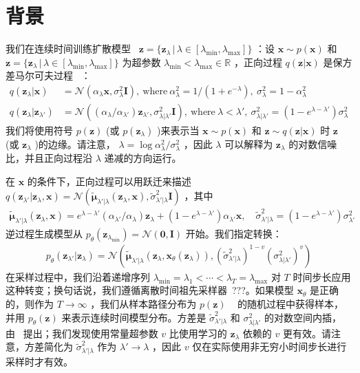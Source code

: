 \documentclass{article}
\newcommand{\bI}{\mathbf{I}}
\newcommand{\bzero}{\mathbf{0}}
\newcommand{\bx}{\mathbf{x}}
\newcommand{\bz}{\mathbf{z}}
\newcommand{\bmu}{{\boldsymbol{\mu}}}
\begin{document}
 \section{
背景} 
 \label{sec:background} 我们在连续时间训练扩散模型~ $\bz =  \{ \bz_\lambda \,|\, \lambda \in [\lambda_{\mathrm{min}}, \lambda_{\mathrm{max}}] \} $ ：设 $\bx \sim p(\bx)$ 和 $\bz =  \{ \bz_\lambda \,|\, \lambda \in [\lambda_{\mathrm{min}}, \lambda_{\mathrm{max}}] \} $ 为超参数 $\lambda_{\mathrm{min}} < \lambda_{\mathrm{max}} \in \mathbb{R}$ ，正向过程 $q(\bz|\bx)$ 是保方差马尔可夫过程~ \citep{sohl2015deep} ：
 \begin{align}
q(\bz_\lambda|\bx) &= \mathcal{N}(\alpha_\lambda \bx, \sigma_\lambda^2 \bI),  \  \text{where} \  \alpha_\lambda^2 = 1/(1+e^{-\lambda}), \  \sigma_\lambda^2 = 1-\alpha_\lambda^2  \\ 
q(\bz_{\lambda} | \bz_{\lambda'}) &= \mathcal{N}((\alpha_{\lambda}/\alpha_{\lambda'})\bz_{\lambda'}, \sigma_{\lambda|\lambda'}^2\bI),  \  \text{where} \  \lambda < \lambda', \  
\sigma^2_{\lambda|\lambda'} = (1-e^{\lambda-\lambda'})\sigma_\lambda^2 
\end{align} 我们将使用符号 $p(\bz)$ (或 $p(\bz_\lambda)$ )来表示当 $\bx \sim p(\bx)$ 和 $\bz \sim q(\bz|\bx)$ 时 $\bz$ (或 $\bz_\lambda$ )的边缘。请注意， $\lambda = \log \alpha_\lambda^2/\sigma_\lambda^2$ ，因此 $\lambda$ 可以解释为 $\bz_\lambda$ 的对数信噪比，并且正向过程沿 $\lambda$ 递减的方向运行。


在 $\bx$ 的条件下，正向过程可以用跃迁来描述
 $q(\bz_{\lambda'}|\bz_\lambda,\bx) = \mathcal{N}(\tilde\bmu_{\lambda'|\lambda}(\bz_\lambda,\bx), \tilde\sigma^2_{\lambda'|\lambda}\bI)$ ，其中
 \begin{align}
\tilde\bmu_{\lambda'|\lambda}(\bz_\lambda,\bx) = e^{\lambda-\lambda'}(\alpha_{\lambda'}/\alpha_{\lambda})\bz_\lambda + (1-e^{\lambda - \lambda'})\alpha_{\lambda'}\bx,
\quad \tilde\sigma^2_{\lambda'|\lambda} = (1-e^{\lambda-\lambda'})\sigma_{\lambda'}^2
\end{align} 逆过程生成模型从 $p_\theta(\bz_{\lambda_{\mathrm{min}}}) = \mathcal{N}(\bzero, \bI)$ 开始。我们指定转换：
 \begin{align}p_\theta(\bz_{\lambda'}|\bz_{\lambda}) = \mathcal{N}(\tilde\bmu_{\lambda'|\lambda}(\bz_\lambda,\bx_\theta(\bz_\lambda)),  (\tilde\sigma^2_{\lambda'|\lambda})^{1-v} (\sigma^2_{\lambda|\lambda'})^v)\end{align} 在采样过程中，我们沿着递增序列 $\lambda_{\mathrm{min}} = \lambda_1 < \cdots < \lambda_T = \lambda_{\mathrm{max}}$ 对 $T$ 时间步长应用这种转变；换句话说，我们遵循离散时间祖先采样器~???。如果模型 $\bx_\theta$ 是正确的，则作为 $T\rightarrow\infty$ ，我们从样本路径分布为 $p(\bz)$ ~ \citep{song2020score} 的随机过程中获得样本，并用 $p_\theta(\bz)$ 来表示连续时间模型分布。方差是 $\tilde\sigma^2_{\lambda'|\lambda}$ 和 $\sigma^2_{\lambda|\lambda'}$ 的对数空间内插，由~ \citet{nichol2021improved} 提出；我们发现使用常量超参数 $v$ 比使用学习的 $\bz_\lambda$ 依赖的 $v$ 更有效。请注意，方差简化为 $\tilde\sigma^2_{\lambda'|\lambda}$ 作为 $\lambda'\rightarrow\lambda$ ，因此 $v$ 仅在实际使用非无穷小时间步长进行采样时才有效。
\end{document}
